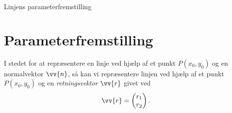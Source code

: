 \begin{center}
\Huge
Linjens parameterfremstilling
\end{center}

\section*{Parameterfremstilling}

I stedet for at repræsentere en linje ved hjælp af et punkt $P(x_0,y_0)$ og en normalvektor $\vv{n}$, så kan vi repræsentere linjen ved hjælp af et punkt $P(x_0,y_0)$ og en \textit{retningsvektor} $\vv{r}$ givet ved 
\begin{align*}
	\vv{r} = 	
	\begin{pmatrix}
 		r_1 \\ r_2
	\end{pmatrix}.
\end{align*}

